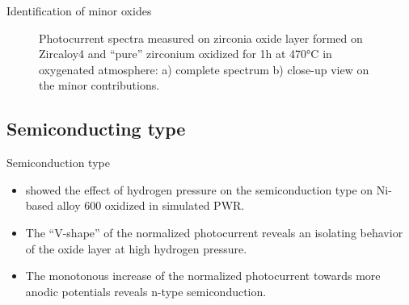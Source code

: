 \documentclass[10pt,compress]{beamer}
\begin{document}
\begin{frame}[allowframebreaks=1.0]{Identification of minor oxides}
\begin{figure}[h]
            \caption{Photocurrent spectra measured on zirconia oxide layer formed on 
            Zircaloy4 and “pure” zirconium oxidized for 1h at 470°C in oxygenated 
            atmosphere\citep{benaboud2007}: a) complete spectrum b) close-up view on the minor contributions.}
            \label{fig_benaboud_minor_oxides}
        \end{figure}
    \end{frame}

\subsection{Semiconducting type}
    \begin{frame}[allowframebreaks=1.0]{Semiconduction type}
        \begin{itemize}
            \item \citet{loucif2013} showed the effect of hydrogen pressure on 
                  the semiconduction type on Ni-based alloy 600 oxidized in simulated PWR. 
            \item The “V-shape” of the normalized photocurrent 
                  reveals an isolating behavior of the oxide layer at high hydrogen pressure. 
            \item The monotonous increase of the 
                  normalized photocurrent towards more anodic potentials reveals 
                  n-type semiconduction.
        \end{itemize}


\end{frame}
\end{document}
